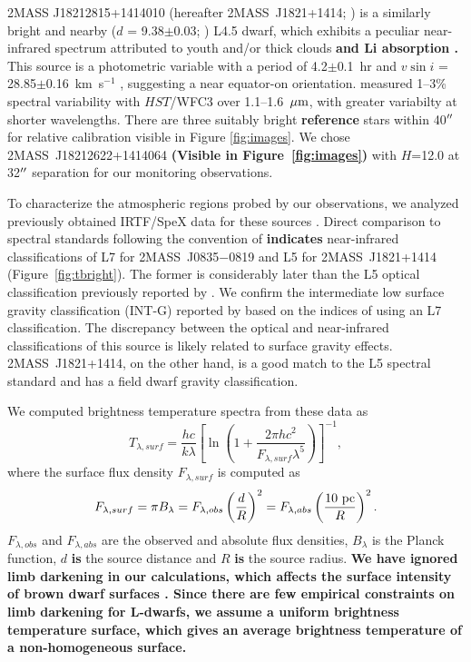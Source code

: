 \documentclass[twocolumn]{aastex6}
\newcommand{\kms}{km~s$^{-1}$}
\newcommand{\sha}{2MASS~J0835$-$0819}
\newcommand{\shb}{2MASS~J1821+1414}
\begin{document}
2MASS J18212815+1414010 (hereafter {\shb}; \citealt{2008ApJ...686..528L}) is a similarly bright and nearby ($d$ = 9.38$\pm$0.03; \citealt{2016MNRAS.455..357S}) L4.5 dwarf, which exhibits a peculiar near-infrared spectrum attributed to youth and/or thick clouds \citep{2008ApJ...686..528L,2015ApJS..219...33G,2016ApJ...833...96L} \textbf{and Li absorption \citep{2008ApJ...686..528L}.}
This source is a photometric variable with a period of 4.2$\pm$0.1~hr \citep{2015ApJ...799..154M} and $v\sin{i}$ = 28.85$\pm$0.16~{\kms}  \citep{2010ApJ...723..684B}, suggesting a near equator-on orientation.  \citet{2015ApJ...798L..13Y} measured 1--3\% spectral variability with $HST$/WFC3 over 1.1--1.6~$\mbox{$\mu$m}$, with greater variabilty at shorter wavelengths.
There are three suitably bright \textbf{reference} stars within 40$\mbox{$^{\prime\prime}$}$ for relative calibration visible in Figure \ref{fig:images}. We chose 2MASS~J18212622+1414064 \textbf{(Visible in Figure~\ref{fig:images})} with $H$=12.0 at 32$\mbox{$^{\prime\prime}$}$ separation for our monitoring observations.

To characterize the atmospheric regions probed by our observations, we analyzed previously 
obtained IRTF/SpeX data for these sources \citep{2008ApJ...686..528L,2010ApJ...710.1142B}.
Direct comparison to spectral standards following the convention of \citet{2010ApJS..190..100K} \textbf{indicates} near-infrared
classifications of L7 for {\sha} and L5 for {\shb} (Figure~\ref{fig:tbright}). The former is considerably later than the L5 optical classification previously reported by \citet{2003AJ....126.2421C}. We confirm the intermediate low surface gravity classification (INT-G) reported by \citet{2016ApJ...833...96L} based on the indices of \citet{2013ApJ...772...79A} using an L7 classification. The discrepancy between the optical and near-infrared classifications of this source is likely related to surface gravity effects. {\shb}, on the other hand, is a good match to the L5 spectral standard and has a field dwarf gravity classification.

We computed brightness temperature spectra from these data as
\begin{equation}
T_{\lambda,surf} = \frac{hc}{k\lambda}\left[\ln\left(1+\frac{2\pi{hc^2}}{F_{\lambda,surf}\lambda^5}\right)\right]^{-1},
\end{equation}
where the surface flux density $F_{\lambda,surf}$ is computed as
\begin{equation}
F_{\lambda,surf} = {\pi}B_{\lambda} = F_{\lambda,obs}\left(\frac{d}{R}\right)^2 = F_{\lambda,abs}\left(\frac{10~{\rm pc}}{R}\right)^2.
\end{equation}
$F_{\lambda,obs}$ and $F_{\lambda,abs}$ are the observed and absolute flux densities, $B_\lambda$ is the Planck function, $d$ \textbf{is} the source distance and $R$ \textbf{is} the source radius.
\textbf{We have ignored limb darkening in our calculations, which affects the surface intensity of brown dwarf surfaces \citep[e.g.][]{2011A&A...529A..75C}.
Since there are few empirical constraints on limb darkening for L-dwarfs, we assume a uniform brightness temperature surface, which gives an average brightness temperature of a non-homogeneous surface.}
\end{document}
